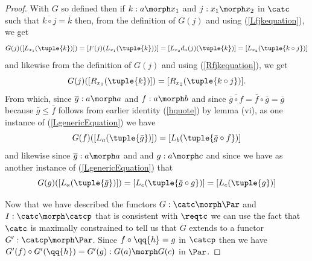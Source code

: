 \begin{proof}
With $G$ so defined then if $k: a \morph x_1$ and $j:x_1 \morph x_2$ in $\catc$ such that $\overline{k \circ j}=\overline{k}$
then, from the definition of $G(j)$ and using  (\ref{Lfjkequation}), we get
\begin{equation}
\label{LgenericEquation}
G(j)([L_{x_1}(\tuple{k})])
=[F(j)(L_{x_1}(\tuple{k}))] 
= [L_{x_2}d_a(j)(\tuple{k})]  
=[L_{x_2}(\tuple{k \circ j})]
\end{equation}
 and likewise from the definition of $G(j)$ and using  (\ref{Rfjkequation}), we get
\begin{equation} 
G(j)([R_{x_1}(\tuple{k})])=[R_{x_2}(\tuple{k \circ j})].
\end{equation} 
From which, since $\overline{g}: a \morph a$ and $f:a \morph b$  
and since $\overline{\overline{g}\circ f} = \bar{f} \circ \bar{g} = \overline{g}$
because $\bar{g} \leq \bar{f}$ follows 
from earlier identity (\ref{hquote}) by lemma (vi),
as one instance of (\ref{LgenericEquation}) we have 
\begin{equation}
\label{Lfequation}
G(f)([L_a(\tuple{\bar{g}})])=[L_{b}(\tuple{\bar{g} \circ f})]
\end{equation}
and likewise since $\overline{g}: a \morph a$ and  and $g:a \morph c$  
and since 
 we have as another instance of (\ref{LgenericEquation}) that
\begin{equation}
\label{Lgequation}
G(g)([L_a(\tuple{\bar{g}})])=[L_{c}(\tuple{\bar{g} \circ g})]=[L_{c}(\tuple{g})]
\end{equation}

Now that we have described the functors  $G: \catc \morph \Par$ and $I:\catc \morph \catcp$ that is consistent with $\reqtc$
we can use the fact that $\catc$ is maximally constrained to tell us that $G$ extends to a functor 
$G' : \catcp \morph \Par$. Since $f \circ \qq{h} = g$ in $\catcp$ then we have
 $G'(f) \circ G'(\qq{h}) = G'(g): G(a) \morph G(c)$ in $\Par$.


\end{proof}
